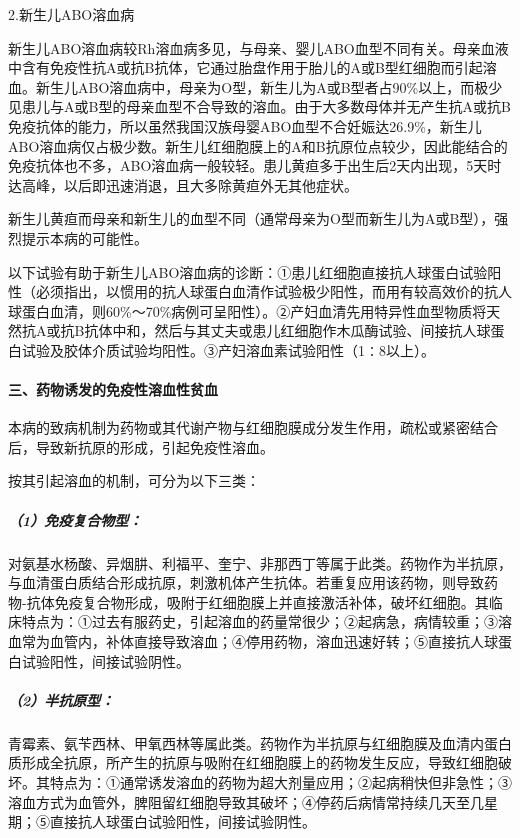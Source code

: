 \hypertarget{text00260.htmlux5cux23CHP33-5-4-1-2-3-2}{}
2.新生儿ABO溶血病

新生儿ABO溶血病较Rh溶血病多见，与母亲、婴儿ABO血型不同有关。母亲血液中含有免疫性抗A或抗B抗体，它通过胎盘作用于胎儿的A或B型红细胞而引起溶血。新生儿ABO溶血病中，母亲为O型，新生儿为A或B型者占90\%以上，而极少见患儿与A或B型的母亲血型不合导致的溶血。由于大多数母体并无产生抗A或抗B免疫抗体的能力，所以虽然我国汉族母婴ABO血型不合妊娠达26.9\%，新生儿ABO溶血病仅占极少数。新生儿红细胞膜上的A和B抗原位点较少，因此能结合的免疫抗体也不多，ABO溶血病一般较轻。患儿黄疸多于出生后2天内出现，5天时达高峰，以后即迅速消退，且大多除黄疸外无其他症状。

新生儿黄疸而母亲和新生儿的血型不同（通常母亲为O型而新生儿为A或B型），强烈提示本病的可能性。

以下试验有助于新生儿ABO溶血病的诊断：①患儿红细胞直接抗人球蛋白试验阳性（必须指出，以惯用的抗人球蛋白血清作试验极少阳性，而用有较高效价的抗人球蛋白血清，则60\%～70\%病例可呈阳性）。②产妇血清先用特异性血型物质将天然抗A或抗B抗体中和，然后与其丈夫或患儿红细胞作木瓜酶试验、间接抗人球蛋白试验及胶体介质试验均阳性。③产妇溶血素试验阳性（1∶8以上）。

\paragraph{三、药物诱发的免疫性溶血性贫血}

本病的致病机制为药物或其代谢产物与红细胞膜成分发生作用，疏松或紧密结合后，导致新抗原的形成，引起免疫性溶血。

按其引起溶血的机制，可分为以下三类：

\subparagraph{（1）免疫复合物型：}

对氨基水杨酸、异烟肼、利福平、奎宁、非那西丁等属于此类。药物作为半抗原，与血清蛋白质结合形成抗原，刺激机体产生抗体。若重复应用该药物，则导致药物-抗体免疫复合物形成，吸附于红细胞膜上并直接激活补体，破坏红细胞。其临床特点为：①过去有服药史，引起溶血的药量常很少；②起病急，病情较重；③溶血常为血管内，补体直接导致溶血；④停用药物，溶血迅速好转；⑤直接抗人球蛋白试验阳性，间接试验阴性。

\subparagraph{（2）半抗原型：}

青霉素、氨苄西林、甲氧西林等属此类。药物作为半抗原与红细胞膜及血清内蛋白质形成全抗原，所产生的抗原与吸附在红细胞膜上的药物发生反应，导致红细胞破坏。其特点为：①通常诱发溶血的药物为超大剂量应用；②起病稍快但非急性；③溶血方式为血管外，脾阻留红细胞导致其破坏；④停药后病情常持续几天至几星期；⑤直接抗人球蛋白试验阳性，间接试验阴性。

